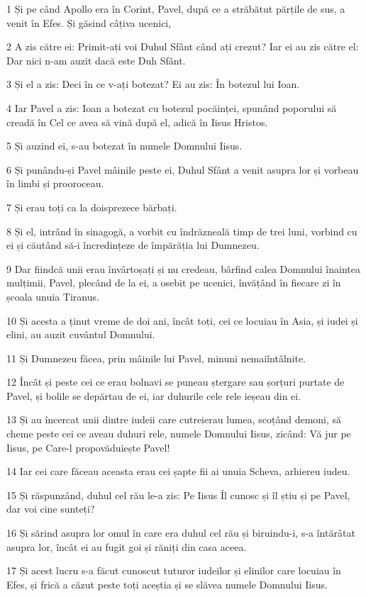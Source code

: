 \par 1 Și pe când Apollo era în Corint, Pavel, după ce a străbătut părțile de sus, a venit în Efes. Și găsind câțiva ucenici,
\par 2 A zis către ei: Primit-ați voi Duhul Sfânt când ați crezut? Iar ei au zis către el: Dar nici n-am auzit dacă este Duh Sfânt.
\par 3 Și el a zis: Deci în ce v-ați botezat? Ei au zis: În botezul lui Ioan.
\par 4 Iar Pavel a zis: Ioan a botezat cu botezul pocăinței, spunând poporului să creadă în Cel ce avea să vină după el, adică în Iisus Hristos.
\par 5 Și auzind ei, s-au botezat în numele Domnului Iisus.
\par 6 Și punându-și Pavel mâinile peste ei, Duhul Sfânt a venit asupra lor și vorbeau în limbi și prooroceau.
\par 7 Și erau toți ca la doisprezece bărbați.
\par 8 Și el, intrând în sinagogă, a vorbit cu îndrăzneală timp de trei luni, vorbind cu ei și căutând să-i încredințeze de împărăția lui Dumnezeu.
\par 9 Dar fiindcă unii erau învârtoșați și nu credeau, bârfind calea Domnului înaintea mulțimii, Pavel, plecând de la ei, a osebit pe ucenici, învățând în fiecare zi în școala unuia Tiranus.
\par 10 Și acesta a ținut vreme de doi ani, încât toți, cei ce locuiau în Asia, și iudei și elini, au auzit cuvântul Domnului.
\par 11 Și Dumnezeu făcea, prin mâinile lui Pavel, minuni nemaiîntâlnite.
\par 12 Încât și peste cei ce erau bolnavi se puneau ștergare sau șorțuri purtate de Pavel, și bolile se depărtau de ei, iar duhurile cele rele ieșeau din ei.
\par 13 Și au încercat unii dintre iudeii care cutreierau lumea, scoțând demoni, să cheme peste cei ce aveau duhuri rele, numele Domnului Iisus, zicând: Vă jur pe Iisus, pe Care-l propovăduiește Pavel!
\par 14 Iar cei care făceau aceasta erau cei șapte fii ai unuia Scheva, arhiereu iudeu.
\par 15 Și răspunzând, duhul cel rău le-a zis: Pe Iisus Îl cunosc și îl știu și pe Pavel, dar voi cine sunteți?
\par 16 Și sărind asupra lor omul în care era duhul cel rău și biruindu-i, s-a întărâtat asupra lor, încât ei au fugit goi și răniți din casa aceea.
\par 17 Și acest lucru s-a făcut cunoscut tuturor iudeilor și elinilor care locuiau în Efes, și frică a căzut peste toți aceștia și se slăvea numele Domnului Iisus.
